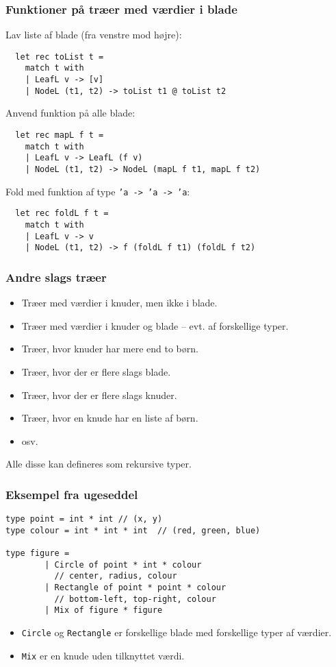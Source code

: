\documentclass{beamer}
\begin{document}
\begin{frame}[fragile=singleslide]
\frametitle{Funktioner på træer med værdier i blade}

Lav liste af blade (fra venstre mod højre):
\begin{verbatim}
  let rec toList t =
    match t with
    | LeafL v -> [v]
    | NodeL (t1, t2) -> toList t1 @ toList t2
\end{verbatim}

Anvend funktion på alle blade:
\begin{verbatim}
  let rec mapL f t =
    match t with
    | LeafL v -> LeafL (f v)
    | NodeL (t1, t2) -> NodeL (mapL f t1, mapL f t2)
\end{verbatim}

Fold med funktion af type \texttt{'a -> 'a -> 'a}:
\begin{verbatim}
  let rec foldL f t =
    match t with
    | LeafL v -> v
    | NodeL (t1, t2) -> f (foldL f t1) (foldL f t2)
\end{verbatim}

\end{frame}

\begin{frame}[fragile=singleslide]
\frametitle{Andre slags træer}

\begin{itemize}
\item Træer med værdier i knuder, men ikke i blade.
\item Træer med værdier i knuder og blade -- evt. af forskellige typer.
\item Træer, hvor knuder har mere end to børn.
\item Træer, hvor der er flere slags blade.
\item Træer, hvor der er flere slags knuder.
\item Træer, hvor en knude har en liste af børn.
\item osv.
\end{itemize}

Alle disse kan defineres som rekursive typer.

\end{frame}

\begin{frame}[fragile=singleslide]
\frametitle{Eksempel fra ugeseddel}

\begin{verbatim}
type point = int * int // (x, y)
type colour = int * int * int  // (red, green, blue)

type figure =
        | Circle of point * int * colour
          // center, radius, colour
        | Rectangle of point * point * colour
          // bottom-left, top-right, colour
        | Mix of figure * figure
\end{verbatim}

\begin{itemize}
\item \texttt{Circle} og \texttt{Rectangle} er forskellige blade med
  forskellige typer af værdier.
\item \texttt{Mix} er en knude uden tilknyttet værdi.
\end{itemize}

\end{frame}
\end{document}

